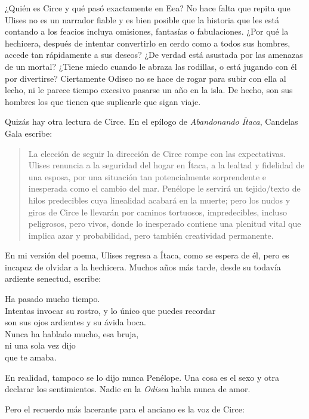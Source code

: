 ¿Quién es Circe y qué pasó exactamente en Eea? No hace falta que repita que Ulises no es un narrador fiable y es bien posible que la historia que les está contando a los feacios incluya omisiones, fantasías o fabulaciones. ¿Por qué la hechicera, después de intentar convertirlo en cerdo como a todos sus hombres, accede tan rápidamente a sus deseos? ¿De verdad está asustada por las amenazas de un mortal? ¿Tiene miedo cuando le abraza las rodillas, o está jugando con él por divertirse? Ciertamente Odiseo no se hace de rogar para subir con ella al lecho, ni le parece tiempo excesivo pasarse un año en la isla. De hecho, son sus hombres los que tienen que suplicarle que sigan viaje.

Quizás hay otra lectura de Circe. En el epílogo de \emph{Abandonando Ítaca}, Candelas Gala escribe:

\begin{quotation}
La elección de seguir la dirección de Circe rompe con las expectativas. Ulises renuncia a la seguridad del hogar en Ítaca, a la lealtad y fidelidad de una esposa, por una situación tan potencialmente sorprendente e inesperada como el cambio del mar. Penélope le servirá un tejido/texto de hilos predecibles cuya linealidad acabará en la muerte; pero los nudos y giros de Circe le llevarán por caminos tortuosos, impredecibles, incluso peligrosos, pero vivos, donde lo inesperado contiene una plenitud vital que implica azar y probabilidad, pero también creatividad permanente.
\end{quotation}

En mi versión del poema, Ulises regresa a Ítaca, como se espera de él, pero es incapaz de olvidar a la hechicera. Muchos años más tarde, desde su todavía ardiente senectud, escribe:

\begin{versopropio}
Ha pasado mucho tiempo.\\
Intentas invocar su rostro, y lo único que puedes recordar\\
son sus ojos ardientes y su ávida boca.\\
Nunca ha hablado mucho, esa bruja,\\
ni una sola vez dijo\\
que te amaba.
\end{versopropio}

En realidad, tampoco se lo dijo nunca Penélope. Una cosa es el sexo y otra declarar los sentimientos. Nadie en la \emph{Odisea} habla nunca de amor.

Pero el recuerdo más lacerante para el anciano es la voz de Circe:

